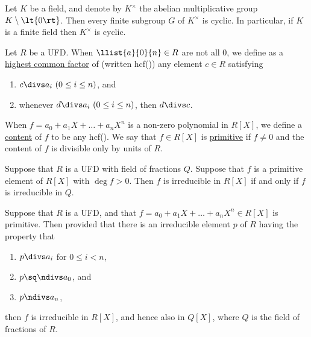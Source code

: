 \documentclass{article}
\begin{document}
  \begin{ttheorem}
    Let \( K \) be a field, and denote by \( K^\times \) the abelian multiplicative group \( K\setminus \lt\{ 0 \rt\} \).
    Then every finite subgroup \( G \) of \( K^\times \) is cyclic.
    In particular, if \( K \) is a finite field then \( K^\times \) is cyclic.
  \end{ttheorem}

  \begin{tdefinition}
    Let \( R \) be a UFD.
    When \( \llist{a}{0}{n}\in R \) are not all 0, we define as a \ul{highest common factor} of  (written hcf()) any element \( c\in R \) satisfying \begin{enumerate}[label=(\roman*)]
      \item \( c\divs a_i\ (0\leq i\leq n) \), and
      \item whenever \( d\divs a_i\ (0\leq i\leq n) \), then \( d\divs c \).
    \end{enumerate}
    When \( f=a_0+a_1X+\ldots +a_nX^n \) is a non-zero polynomial in \( R[X] \), we define a \ul{content} of \( f \) to be any hcf().
    We say that \( f\in R[X] \) is \ul{primitive} if \( f\neq 0 \) and the content of \( f \) is divisible only by units of \( R \).
  \end{tdefinition}

  \begin{ttheorem}
    Suppose that \( R \) is a UFD with field of fractions \( Q \).
    Suppose that \( f \) is a primitive element of \( R[X] \) with \( \deg f > 0 \).
    Then \( f \) is irreducible in \( R[X] \) if and only if \( f \) is irreducible in \( Q \).
  \end{ttheorem}

  \begin{ttheorem}
    Suppose that \( R \) is a UFD, and that \( f=a_0+a_1X+\ldots +a_nX^n \in R[X] \) is primitive.
    Then provided that there is an irreducible element \( p \) of \( R \) having the property that \begin{enumerate}[label=(\roman*)]
      \item \( p\divs a_i \) for \( 0\leq i < n \),
      \item \( p\sq \ndivs a_0 \), and
      \item \( p\ndivs a_n \),
    \end{enumerate}
    then \( f \) is irreducible in \( R[X] \), and hence also in \( Q[X] \), where \( Q \) is the field of fractions of \( R \).
  \end{ttheorem}
\end{document}

